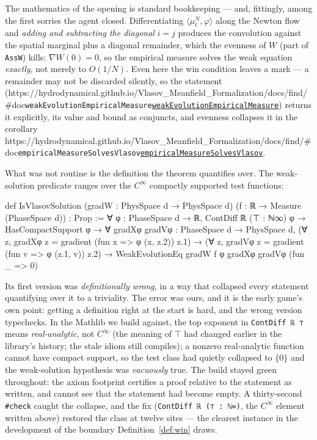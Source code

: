 \documentclass[11pt]{article}
\theoremstyle{plain}
\theoremstyle{definition}
\theoremstyle{remark}
\newcommand{\lean}[1]{\texttt{#1}}
\newcommand{\leanbaseurl}{https://hydrodynamical.github.io/Vlasov\_Meanfield\_Formalization/docs/find/\#doc}
\newcommand{\leanlink}[1]{\ifx\leanbaseurl\empty\lean{#1}\else\href{\leanbaseurl/Vlasov.#1}{\lean{#1}}\fi}
\begin{document}
The mathematics of the opening is standard bookkeeping --- and, fittingly, among the
first sorries the agent closed. Differentiating $\langle\mu^N_t,\varphi\rangle$
along the Newton flow and \emph{adding and subtracting the diagonal} $i=j$ produces
the convolution against the spatial marginal plus a diagonal remainder, which the
evenness of $W$ (part of \lean{AssW}) kills: $\nabla W(0)=0$, so the empirical
measure solves the weak equation \emph{exactly}, not merely to $O(1/N)$. Even here
the win condition leaves a mark --- a remainder may not be discarded silently, so
the statement (\leanlink{weakEvolutionEmpiricalMeasure}) returns it explicitly, its
value and bound as conjuncts, and evenness collapses it in the corollary
\leanlink{empiricalMeasureSolvesVlasov}.

What was not routine is the definition the theorem quantifies over. The
weak-solution predicate ranges over the $C^\infty$ compactly supported test
functions:
\begin{leancode}
def IsVlasovSolution (gradW : PhysSpace d → PhysSpace d)
    (f : ℝ → Measure (PhaseSpace d)) : Prop :=
  ∀ φ : PhaseSpace d → ℝ, ContDiff ℝ (⊤ : ℕ∞) φ → HasCompactSupport φ →
    ∀ gradXφ gradVφ : PhaseSpace d → PhysSpace d,
      (∀ z, gradXφ z = gradient (fun x => φ (x, z.2)) z.1) →
      (∀ z, gradVφ z = gradient (fun v => φ (z.1, v)) z.2) →
      WeakEvolutionEq gradW f φ gradXφ gradVφ (fun _ => 0)
\end{leancode}
Its first version was \emph{definitionally wrong}, in a way that collapsed every
statement quantifying over it to a triviality. The error was ours, and it is the
early game's own point: getting a definition right at the start is hard, and the
wrong version typechecks. In the Mathlib we build against, the top exponent in
\lean{ContDiff ℝ ⊤} means \emph{real-analytic}, not $C^\infty$ (the meaning of
$\top$ had changed earlier in the library's history; the stale idiom still
compiles); a nonzero real-analytic function cannot have compact support, so the
test class had quietly collapsed to $\{0\}$ and the weak-solution hypothesis was
\emph{vacuously} true. The build stayed green throughout: the axiom footprint
certifies a proof relative to the statement as written, and cannot see that the statement had
become empty. A thirty-second \lean{\#check} caught the collapse, and the fix
(\lean{ContDiff ℝ (⊤ : ℕ∞)}, the $C^\infty$ element written above) restored the
class at twelve sites --- the clearest instance in the development of the boundary
Definition~\ref{def:win} draws.
\end{document}
